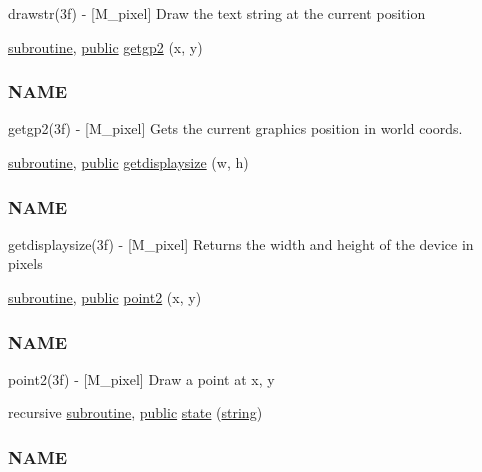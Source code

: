 \begin{DoxyCompactItemize}
\begin{DoxyCompactList}
drawstr(3f) -\/ \mbox{[}M\+\_\+pixel\mbox{]} Draw the text string at the current position \end{DoxyCompactList}\item 
\hyperlink{M__stopwatch_83_8txt_acfbcff50169d691ff02d4a123ed70482}{subroutine}, \hyperlink{M__stopwatch_83_8txt_a2f74811300c361e53b430611a7d1769f}{public} \hyperlink{namespacem__pixel_a626d769d3dae0c292e3ef1617ad43efb}{getgp2} (x, y)
\begin{DoxyCompactList}\small\item\em \subsubsection*{N\+A\+ME}

getgp2(3f) -\/ \mbox{[}M\+\_\+pixel\mbox{]} Gets the current graphics position in world coords. \end{DoxyCompactList}\item 
\hyperlink{M__stopwatch_83_8txt_acfbcff50169d691ff02d4a123ed70482}{subroutine}, \hyperlink{M__stopwatch_83_8txt_a2f74811300c361e53b430611a7d1769f}{public} \hyperlink{namespacem__pixel_acacbc4462423b9aa0f591cbe7aba4ec6}{getdisplaysize} (w, h)
\begin{DoxyCompactList}\small\item\em \subsubsection*{N\+A\+ME}

getdisplaysize(3f) -\/ \mbox{[}M\+\_\+pixel\mbox{]} Returns the width and height of the device in pixels \end{DoxyCompactList}\item 
\hyperlink{M__stopwatch_83_8txt_acfbcff50169d691ff02d4a123ed70482}{subroutine}, \hyperlink{M__stopwatch_83_8txt_a2f74811300c361e53b430611a7d1769f}{public} \hyperlink{namespacem__pixel_a11234e0b33104eb0afb24f928b072053}{point2} (x, y)
\begin{DoxyCompactList}\small\item\em \subsubsection*{N\+A\+ME}

point2(3f) -\/ \mbox{[}M\+\_\+pixel\mbox{]} Draw a point at x, y \end{DoxyCompactList}\item 
recursive \hyperlink{M__stopwatch_83_8txt_acfbcff50169d691ff02d4a123ed70482}{subroutine}, \hyperlink{M__stopwatch_83_8txt_a2f74811300c361e53b430611a7d1769f}{public} \hyperlink{namespacem__pixel_aa24c465b23b0ddda341e97bc206fe249}{state} (\hyperlink{what__overview_81_8txt_a74cb7e955273b9f9157b4f0c18a38849}{string})
\begin{DoxyCompactList}\small\item\em \subsubsection*{N\+A\+ME}


\end{DoxyCompactList}
\end{DoxyCompactItemize}
